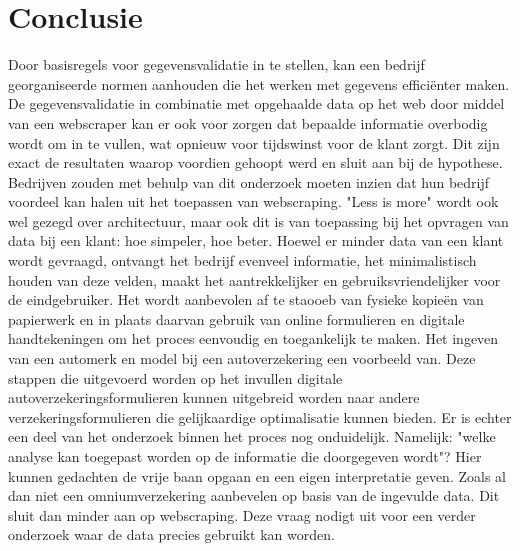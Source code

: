 
\chapter{Conclusie}
\label{ch:conclusie}


Door basisregels voor gegevensvalidatie in te stellen, kan een bedrijf georganiseerde normen aanhouden die het werken met gegevens efficiënter maken.
De gegevensvalidatie in combinatie met opgehaalde data op het web door middel van een webscraper kan er ook voor zorgen dat bepaalde informatie overbodig wordt om in te vullen, wat opnieuw voor tijdswinst voor de klant zorgt. Dit zijn exact de resultaten waarop voordien gehoopt werd en sluit aan bij de hypothese. Bedrijven zouden met behulp van dit onderzoek moeten inzien dat hun bedrijf voordeel kan halen uit het toepassen van webscraping. "Less is more" wordt ook wel gezegd over architectuur, maar ook dit is van toepassing bij het opvragen van data bij een klant: hoe simpeler, hoe beter. Hoewel er minder data van een klant wordt gevraagd, ontvangt het bedrijf evenveel informatie, het minimalistisch houden van deze velden, maakt het aantrekkelijker en gebruiksvriendelijker voor de eindgebruiker. Het wordt aanbevolen af te staooeb van fysieke kopieën van papierwerk en in plaats daarvan gebruik van online formulieren en digitale handtekeningen om het proces eenvoudig en toegankelijk te maken. Het ingeven van een automerk en model bij een autoverzekering een voorbeeld van. Deze stappen die uitgevoerd worden op het invullen digitale autoverzekeringsformulieren kunnen uitgebreid worden naar andere verzekeringsformulieren die gelijkaardige optimalisatie kunnen bieden. Er is echter een deel van het onderzoek binnen het proces nog onduidelijk. Namelijk: "welke analyse kan toegepast worden op de informatie die doorgegeven wordt"? Hier kunnen gedachten de vrije baan opgaan en een eigen interpretatie geven. Zoals al dan niet een omniumverzekering aanbevelen op basis van de ingevulde data. Dit sluit dan minder aan op webscraping. Deze vraag nodigt uit voor een verder onderzoek waar de data precies gebruikt kan worden.

